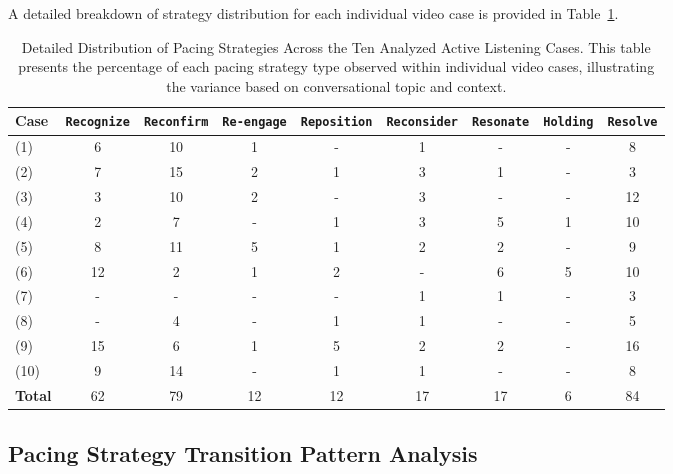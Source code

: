 A detailed breakdown of strategy distribution for each individual video case is provided in Table~\ref{tab:video-breakdown}.
\begin{table}[ht]
  \caption{Detailed Distribution of Pacing Strategies Across the Ten Analyzed Active Listening Cases. This table presents the percentage of each pacing strategy type observed within individual video cases, illustrating the variance based on conversational topic and context.}
  \label{tab:video-breakdown}
  \renewcommand{\arraystretch}{1.2}
  \begin{tabular}{l c c c c c c c c}
    \toprule
    \textbf{Case}  & \textbf{\texttt{Recognize}} & \textbf{\texttt{Reconfirm}} & \textbf{\texttt{Re-engage}}& 
    \textbf{\texttt{Reposition}} & \textbf{\texttt{Reconsider}} & \textbf{\texttt{Resonate}} & \textbf{\texttt{Holding}} & \textbf{\texttt{Resolve}}  \\
    \midrule
    (1) & 6 & 10 & 1 & - & 1 & -& - & 8\\
    (2) & 7 & 15 & 2 & 1 & 3 & 1 & - & {3} \\
    {(3)} & {3} & {10} & {2} & {-}& {3} &{-} & {-}& {12} \\
    {(4)} & {2} & {7} & {-}& {1} & {3} & {5} & {1}& {10} \\
    {(5)} &  {8} & {11} & {5} & {1} & {2} & {2} & {-}& {9} \\
    {(6)} &  {12} & {2} & {1} & {2} & {-}& {6} & {5} & {10}\\
    {(7)} & {-}& {-}&{-} & {-}& {1}& {1} & {-}& {3}\\
    {(8)} & {-}& {4} & {-}& {1} & {1} & {-}& {-}& {5} \\
     {(9)} & {15} & {6} & {1} & {5} & {2} & {2} & {-}& {16} \\
    {(10)} & {9} & {14} & {-}& {1} & {1} & {-}& {-}& {8}\\
    \midrule
    \textbf{Total}  & 62 & 79& {12}& {12} &17 &17 &6 & 84\\
    \bottomrule
  \end{tabular}%
\end{table}

\subsection{Pacing Strategy Transition Pattern Analysis}
\label{appx:transition}

